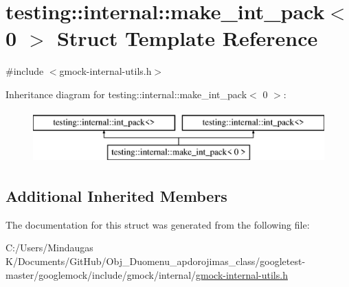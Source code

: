 \hypertarget{structtesting_1_1internal_1_1make__int__pack_3_010_01_4}{}\section{testing\+::internal\+::make\+\_\+int\+\_\+pack$<$ 0 $>$ Struct Template Reference}
\label{structtesting_1_1internal_1_1make__int__pack_3_010_01_4}


{\ttfamily \#include $<$gmock-\/internal-\/utils.\+h$>$}

Inheritance diagram for testing\+::internal\+::make\+\_\+int\+\_\+pack$<$ 0 $>$\+:\begin{figure}[H]
\begin{center}
\leavevmode
\includegraphics[height=2.000000cm]{df/d53/structtesting_1_1internal_1_1make__int__pack_3_010_01_4}
\end{center}
\end{figure}
\subsection*{Additional Inherited Members}


The documentation for this struct was generated from the following file\+:\begin{DoxyCompactItemize}
\item 
C\+:/\+Users/\+Mindaugas K/\+Documents/\+Git\+Hub/\+Obj\+\_\+\+Duomenu\+\_\+apdorojimas\+\_\+class/googletest-\/master/googlemock/include/gmock/internal/\mbox{\hyperlink{googletest-master_2googlemock_2include_2gmock_2internal_2gmock-internal-utils_8h}{gmock-\/internal-\/utils.\+h}}\end{DoxyCompactItemize}
